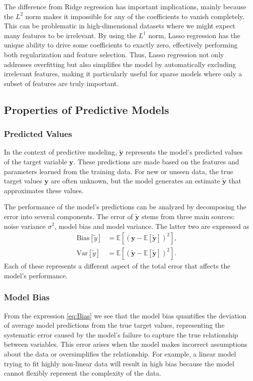 \documentclass[aps,pra,english,notitlepage,reprint,nofootinbib]{revtex4-1}  %
\begin{document}
The difference from Ridge regression has important implications, mainly because the $L^2$ norm makes it impossible for any of the coefficients to vanish completely. This can be problematic in high-dimensional datasets where we might expect many features to be irrelevant. By using the $L^1$ norm, Lasso regression has the unique ability to drive some coefficients to exactly zero, effectively performing both regularization and feature selection. Thus, Lasso regression not only addresses overfitting but also simplifies the model by automatically excluding irrelevant features, making it particularly useful for sparse models where only a subset of features are truly important.


\subsection{Properties of Predictive Models}\label{subsec:tradeoff}
\subsubsection{Predicted Values}
In the context of predictive modeling, $\mathbf{\tilde{y}}$ represents the model's predicted values of the target variable $\mathbf{y}$. These predictions are made based on the features and parameters learned from the training data. For new or unseen data, the true target values $\mathbf{y}$ are often unknown, but the model generates an estimate $\mathbf{\tilde{y}}$ that approximates these values.

The performance of the model's predictions can be analyzed by decomposing the error into several components. The error of $\mathbf{\tilde{y}}$ stems from three main sources: noise variance $\sigma^2$, model bias and model variance. The latter two are expressed as
\begin{align}
  \text{Bias}\left[\tilde{y}\right] &= \mathbb{E}\left[\left(\mathbf{y}-\mathbb{E}\left[\mathbf{\tilde{y}}\right] \right)^2\right], \label{eq:Bias}
  \\
  \text{Var}\left[\tilde{y}\right] &= \mathbb{E}\left[\left(\mathbf{\tilde{y}}-\mathbb{E}\left[\mathbf{\tilde{y}}\right] \right)^2\right]. \label{eq:Var}
\end{align}
Each of these represents a different aspect of the total error that affects the model's performance.

\vspace*{-2.5pt}
\subsubsection{Model Bias}
\vspace*{-2.5pt}
From the expression \eqref{eq:Bias} we see that the model bias quantifies the deviation of average model predictions from the true target values, representing the systematic error caused by the model's failure to capture the true relationship between variables. This error arises when the model makes incorrect assumptions about the data or oversimplifies the relationship. For example, a linear model trying to fit highly non-linear data will result in high bias because the model cannot flexibly represent the complexity of the data.
\end{document}
